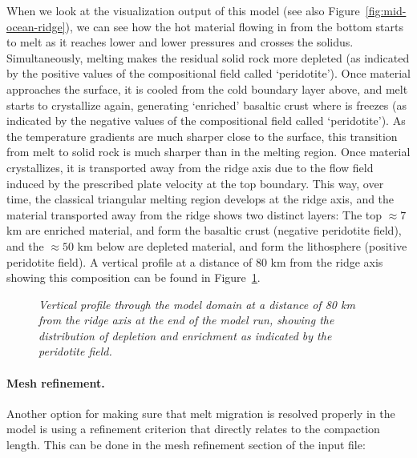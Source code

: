 When we look at the visualization output of this model (see also Figure~\ref{fig:mid-ocean-ridge}),
we can see how the hot material flowing in
from the bottom starts to melt as it reaches lower and lower pressures and crosses the solidus.  Simultaneously, melting makes the residual solid rock more depleted (as indicated by the positive
values of the compositional field called `peridotite'). Once material approaches the surface,
it is cooled from the cold boundary layer above, and melt starts to crystallize again, generating
`enriched' basaltic crust where is freezes (as indicated by the negative values of the compositional
field called `peridotite'). As the temperature gradients are much sharper close to the surface, this
transition from melt to solid rock is much sharper than in the melting region. Once material
crystallizes, it is transported away from the ridge axis due to the flow field induced by the prescribed
plate velocity at the top boundary. This way, over time, the classical triangular melting region develops
at the ridge axis, and the material transported away from the ridge shows two distinct layers:
The top $\approx 7$ km are enriched material, and form the basaltic crust (negative peridotite field),
and the $\approx 50$ km below are depleted material, and form the lithosphere (positive peridotite field).
A vertical profile at a distance of 80 km from the ridge axis showing this composition can be found in Figure~\ref{fig:mid-ocean-ridge-profile}.

\begin{figure}
    \centering
    
    \caption{\it Vertical profile through the model domain at a distance of 80 km from the ridge axis
             at the end of the model run, showing the distribution of depletion and enrichment as
             indicated by the peridotite field.}
    \label{fig:mid-ocean-ridge-profile}
\end{figure}

\paragraph{Mesh refinement.}
Another option for making sure that melt migration is resolved properly in the model is using a
refinement criterion that directly relates to the compaction length. This can be done in the mesh
refinement section of the input file:




